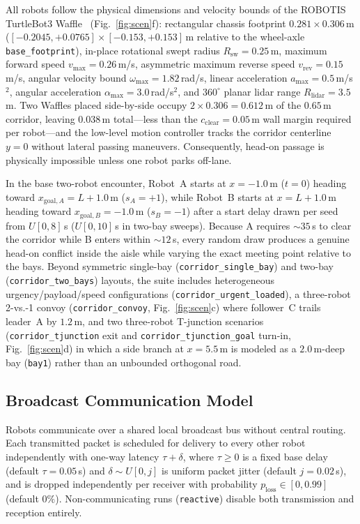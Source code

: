\documentclass[letterpaper,journal]{IEEEtran}
\begin{document}
All robots follow the physical dimensions and velocity bounds of the ROBOTIS TurtleBot3 Waffle~\cite{turtlebot3} (Fig.~\ref{fig:scen}f): rectangular chassis footprint $0.281\times 0.306$\,m ($[-0.2045,+0.0765]\times[-0.153,+0.153]$\,m relative to the wheel-axle \texttt{base\_footprint}), in-place rotational swept radius $R_{\mathrm{sw}}=0.25$\,m, maximum forward speed $v_{\max}=0.26$\,m/s, asymmetric maximum reverse speed $v_{\mathrm{rev}}=0.15$\,m/s, angular velocity bound $\omega_{\max}=1.82$\,rad/s, linear acceleration $a_{\max}=0.5$\,m/s$^2$, angular acceleration $\alpha_{\max}=3.0$\,rad/s$^2$, and $360^\circ$ planar lidar range $R_{\mathrm{lidar}}=3.5$\,m. Two Waffles placed side-by-side occupy $2\times 0.306=0.612$\,m of the $0.65$\,m corridor, leaving $0.038$\,m total---less than the $c_{\mathrm{clear}}=0.05$\,m wall margin required per robot---and the low-level motion controller tracks the corridor centerline $y=0$ without lateral passing maneuvers. Consequently, head-on passage is physically impossible unless one robot parks off-lane.

In the base two-robot encounter, Robot~A starts at $x=-1.0$\,m ($t=0$) heading toward $x_{\mathrm{goal},A}=L+1.0$\,m ($s_A=+1$), while Robot~B starts at $x=L+1.0$\,m heading toward $x_{\mathrm{goal},B}=-1.0$\,m ($s_B=-1$) after a start delay drawn per seed from $U[0,8]$\,s ($U[0,10]$\,s in two-bay sweeps). Because A requires $\sim 35$\,s to clear the corridor while B enters within $\sim 12$\,s, every random draw produces a genuine head-on conflict inside the aisle while varying the exact meeting point relative to the bays. Beyond symmetric single-bay (\texttt{corridor\_single\_bay}) and two-bay (\texttt{corridor\_two\_bays}) layouts, the suite includes heterogeneous urgency/payload/speed configurations (\texttt{corridor\_urgent\_loaded}), a three-robot 2-vs.-1 convoy (\texttt{corridor\_convoy}, Fig.~\ref{fig:scen}c) where follower~C trails leader~A by $1.2$\,m, and two three-robot T-junction scenarios (\texttt{corridor\_tjunction} exit and \texttt{corridor\_tjunction\_goal} turn-in, Fig.~\ref{fig:scen}d) in which a side branch at $x=5.5$\,m is modeled as a $2.0$\,m-deep bay (\texttt{bay1}) rather than an unbounded orthogonal road.

\subsection{Broadcast Communication Model}
Robots communicate over a shared local broadcast bus without central routing. Each transmitted packet is scheduled for delivery to every other robot independently with one-way latency $\tau + \delta$, where $\tau\ge 0$ is a fixed base delay (default $\tau=0.05$\,s) and $\delta\sim U[0,j]$ is uniform packet jitter (default $j=0.02$\,s), and is dropped independently per receiver with probability $p_{\mathrm{loss}}\in[0,0.99]$ (default $0\%$). Non-communicating runs (\texttt{reactive}) disable both transmission and reception entirely.
\end{document}
